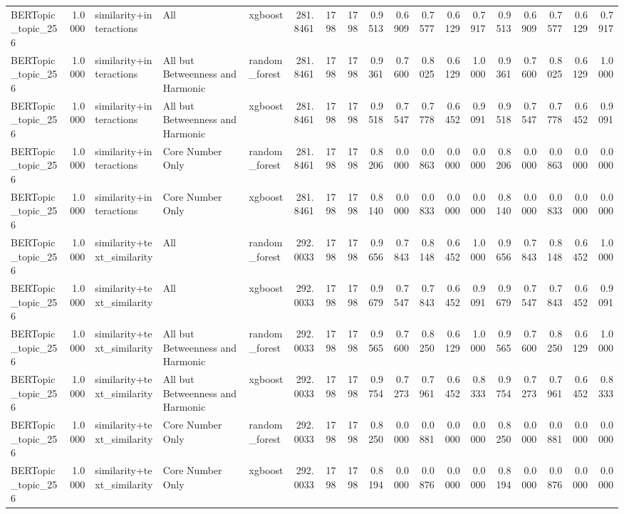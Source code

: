 \begin{tabular}{lrlllrrrrrrrrrrrrr}
BERTopic_topic_256 & 1.0000 & similarity+interactions & All & xgboost & 281.8461 & 1798 & 1798 & 0.9513 & 0.6909 & 0.7577 & 0.6129 & 0.7917 & 0.9513 & 0.6909 & 0.7577 & 0.6129 & 0.7917 \\
BERTopic_topic_256 & 1.0000 & similarity+interactions & All but Betweenness and Harmonic & random_forest & 281.8461 & 1798 & 1798 & 0.9361 & 0.7600 & 0.8025 & 0.6129 & 1.0000 & 0.9361 & 0.7600 & 0.8025 & 0.6129 & 1.0000 \\
BERTopic_topic_256 & 1.0000 & similarity+interactions & All but Betweenness and Harmonic & xgboost & 281.8461 & 1798 & 1798 & 0.9518 & 0.7547 & 0.7778 & 0.6452 & 0.9091 & 0.9518 & 0.7547 & 0.7778 & 0.6452 & 0.9091 \\
BERTopic_topic_256 & 1.0000 & similarity+interactions & Core Number Only & random_forest & 281.8461 & 1798 & 1798 & 0.8206 & 0.0000 & 0.0863 & 0.0000 & 0.0000 & 0.8206 & 0.0000 & 0.0863 & 0.0000 & 0.0000 \\
BERTopic_topic_256 & 1.0000 & similarity+interactions & Core Number Only & xgboost & 281.8461 & 1798 & 1798 & 0.8140 & 0.0000 & 0.0833 & 0.0000 & 0.0000 & 0.8140 & 0.0000 & 0.0833 & 0.0000 & 0.0000 \\
BERTopic_topic_256 & 1.0000 & similarity+text_similarity & All & random_forest & 292.0033 & 1798 & 1798 & 0.9656 & 0.7843 & 0.8148 & 0.6452 & 1.0000 & 0.9656 & 0.7843 & 0.8148 & 0.6452 & 1.0000 \\
BERTopic_topic_256 & 1.0000 & similarity+text_similarity & All & xgboost & 292.0033 & 1798 & 1798 & 0.9679 & 0.7547 & 0.7843 & 0.6452 & 0.9091 & 0.9679 & 0.7547 & 0.7843 & 0.6452 & 0.9091 \\
BERTopic_topic_256 & 1.0000 & similarity+text_similarity & All but Betweenness and Harmonic & random_forest & 292.0033 & 1798 & 1798 & 0.9565 & 0.7600 & 0.8250 & 0.6129 & 1.0000 & 0.9565 & 0.7600 & 0.8250 & 0.6129 & 1.0000 \\
BERTopic_topic_256 & 1.0000 & similarity+text_similarity & All but Betweenness and Harmonic & xgboost & 292.0033 & 1798 & 1798 & 0.9754 & 0.7273 & 0.7961 & 0.6452 & 0.8333 & 0.9754 & 0.7273 & 0.7961 & 0.6452 & 0.8333 \\
BERTopic_topic_256 & 1.0000 & similarity+text_similarity & Core Number Only & random_forest & 292.0033 & 1798 & 1798 & 0.8250 & 0.0000 & 0.0881 & 0.0000 & 0.0000 & 0.8250 & 0.0000 & 0.0881 & 0.0000 & 0.0000 \\
BERTopic_topic_256 & 1.0000 & similarity+text_similarity & Core Number Only & xgboost & 292.0033 & 1798 & 1798 & 0.8194 & 0.0000 & 0.0876 & 0.0000 & 0.0000 & 0.8194 & 0.0000 & 0.0876 & 0.0000 & 0.0000 \\

\end{tabular}
